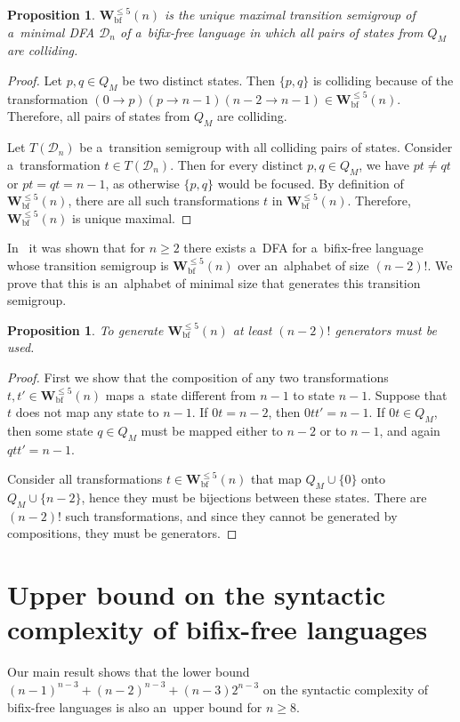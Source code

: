 \documentclass{amsart}
\newtheorem{proposition}[theorem]{Proposition}
\renewcommand{\le}{\leqslant}
\renewcommand{\ge}{\geqslant}
\newcommand{\Vbf}{\mathbf{W}^{\le 5}_{\mathrm{bf}}}
\newcommand{\cD}{{\mathcal D}}
\begin{document}
\begin{proposition}\label{pro:Vbf_unique}
$\Vbf(n)$ is the unique maximal transition semigroup of a~minimal DFA $\cD_n$ of a~bifix-free language in which all pairs of states from $Q_M$ are colliding.
\end{proposition}
\begin{proof}
Let $p,q \in Q_M$ be two distinct states.
Then $\{p,q\}$ is colliding because of the transformation $(0 \to p)(p \to n-1)(n-2 \to n-1) \in \Vbf(n)$.
Therefore, all pairs of states from $Q_M$ are colliding.

Let $T(\cD_n)$ be a~transition semigroup with all colliding pairs of states.
Consider a~transformation $t \in T(\cD_n)$.
Then for every distinct $p,q \in Q_M$, we have $pt \neq qt$ or $pt = qt = n-1$, as otherwise $\{p,q\}$ would be focused.
By definition of $\Vbf(n)$, there are all such transformations $t$ in $\Vbf(n)$.
Therefore, $\Vbf(n)$ is unique maximal.
\end{proof}

In~\cite{BLY12} it was shown that for $n \ge 2$ there exists a~DFA for a~bifix-free language
whose transition semigroup is $\Vbf(n)$ over an~alphabet of size $(n-2)!$.
We prove that this is an~alphabet of minimal size that generates this transition semigroup.
\begin{proposition}\label{pro:Vbf_alphabet_lower_bound}
To generate $\Vbf(n)$ at least $(n-2)!$ generators must be used.
\end{proposition}
\begin{proof}
First we show that the composition of any two transformations $t,t' \in \Vbf(n)$ maps a~state different from $n-1$ to state $n-1$.
Suppose that $t$ does not map any state to $n-1$.
If $0t = n-2$, then $0tt' = n-1$.
If $0t \in Q_M$, then some state $q \in Q_M$ must be mapped either to $n-2$ or to $n-1$, and again $qtt' = n-1$.

Consider all transformations $t \in \Vbf(n)$ that map $Q_M \cup \{0\}$ onto $Q_M \cup \{n-2\}$, hence they must be bijections between these states.
There are $(n-2)!$ such transformations, and since they cannot be generated by compositions, they must be generators.
\end{proof}

\section{Upper bound on the syntactic complexity of bifix-free languages}

Our main result shows that the lower bound $(n-1)^{n-3}+(n-2)^{n-3}+(n-3)2^{n-3}$ on the syntactic complexity of bifix-free languages is also an~upper bound for $n \ge 8$.
\end{document}
